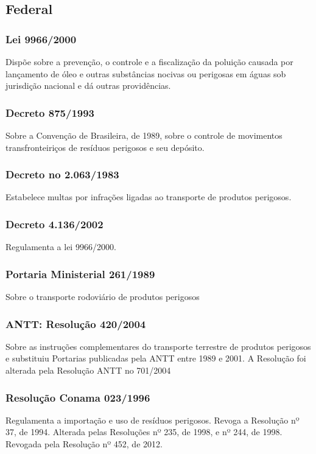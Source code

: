 \begin{subapend}
	\subsection{Federal}
	\begin{subsubapend}
		
		\subsubsection{Lei 9966/2000}
		Dispõe sobre a prevenção, o controle e a fiscalização da poluição causada por lançamento de óleo e outras substâncias nocivas ou perigosas em águas sob jurisdição nacional e dá outras providências.
		\subsubsection{Decreto 875/1993}
		Sobre a Convenção de Brasileira, de 1989, sobre o controle de movimentos transfronteiriços de resíduos perigosos e seu depósito.
		\subsubsection{Decreto no 2.063/1983}
		Estabelece multas por infrações ligadas ao transporte de produtos perigosos.
		\subsubsection{Decreto 4.136/2002}
		Regulamenta a lei 9966/2000.
		\subsubsection{Portaria Ministerial 261/1989}
		Sobre o transporte rodoviário de produtos perigosos
		\subsubsection{ANTT: Resolução 420/2004}
		Sobre as instruções complementares do transporte terrestre de produtos perigosos e substituiu Portarias publicadas pela ANTT entre 1989 e 2001. A Resolução foi alterada pela Resolução ANTT no 701/2004
		\subsubsection{Resolução Conama 023/1996}
		Regulamenta a importação e uso de resíduos perigosos. Revoga a Resolução nº 37, de 1994. Alterada pelas Resoluções nº 235, de 1998, e nº 244, de 1998. Revogada pela Resolução nº 452, de 2012.

\end{subsubapend}
\end{subapend}
